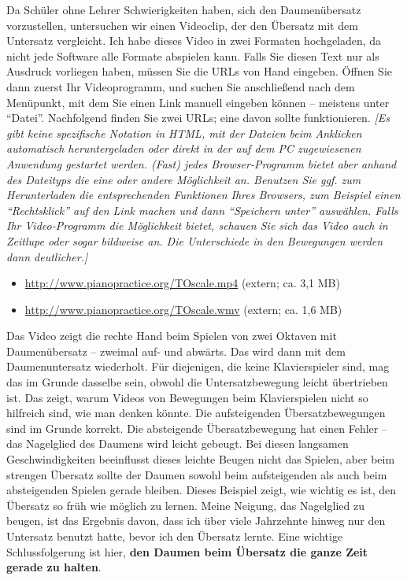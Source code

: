 Da Schüler ohne Lehrer Schwierigkeiten haben, sich den Daumenübersatz vorzustellen, untersuchen wir einen Videoclip, der den Übersatz mit dem Untersatz vergleicht.
Ich habe dieses Video in zwei Formaten hochgeladen, da nicht jede Software alle Formate abspielen kann.
Falls Sie diesen Text nur als Ausdruck vorliegen haben, müssen Sie die URLs von Hand eingeben.
Öffnen Sie dann zuerst Ihr Videoprogramm, und suchen Sie anschließend nach dem Menüpunkt, mit dem Sie einen Link manuell eingeben können -- meistens unter \enquote{Datei}.
Nachfolgend finden Sie zwei URLs; eine davon sollte funktionieren.
\textit{[Es gibt keine spezifische Notation in HTML, mit der Dateien beim Anklicken automatisch heruntergeladen oder direkt in der auf dem PC zugewiesenen Anwendung gestartet werden.
(Fast) jedes Browser-Programm bietet aber anhand des Dateityps die eine oder andere Möglichkeit an.
Benutzen Sie ggf. zum Herunterladen die entsprechenden Funktionen Ihres Browsers, zum Beispiel einen \enquote{Rechtsklick} auf den Link machen und dann \enquote{Speichern unter} auswählen.
Falls Ihr Video-Programm die Möglichkeit bietet, schauen Sie sich das Video auch in Zeitlupe oder sogar bildweise an.  Die Unterschiede in den Bewegungen werden dann deutlicher.]}

\begin{itemize}
 \item \url{http://www.pianopractice.org/TOscale.mp4} (extern; ca. 3,1 MB)
 \item \url{http://www.pianopractice.org/TOscale.wmv} (extern; ca. 1,6 MB)
\end{itemize}

Das Video zeigt die rechte Hand beim Spielen von zwei Oktaven mit Daumenübersatz -- zweimal auf- und abwärts.
Das wird dann mit dem Daumenuntersatz wiederholt.
Für diejenigen, die keine Klavierspieler sind, mag das im Grunde dasselbe sein, obwohl die Untersatzbewegung leicht übertrieben ist.
Das zeigt, warum Videos von Bewegungen beim Klavierspielen nicht so hilfreich sind, wie man denken könnte.
Die aufsteigenden Übersatzbewegungen sind im Grunde korrekt.
Die absteigende Übersatzbewegung hat einen Fehler -- das Nagelglied des Daumens wird leicht gebeugt.
Bei diesen langsamen Geschwindigkeiten beeinflusst dieses leichte Beugen nicht das Spielen, aber beim strengen Übersatz sollte der Daumen sowohl beim aufsteigenden als auch beim absteigenden Spielen gerade bleiben.
Dieses Beispiel zeigt, wie wichtig es ist, den Übersatz so früh wie möglich zu lernen.
Meine Neigung, das Nagelglied zu beugen, ist das Ergebnis davon, dass ich über viele Jahrzehnte hinweg nur den Untersatz benutzt hatte, bevor ich den Übersatz lernte.
Eine wichtige Schlussfolgerung ist hier, \textbf{den Daumen beim Übersatz die ganze Zeit gerade zu halten}.



